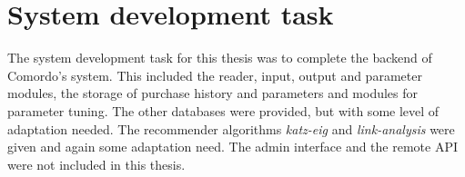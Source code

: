 
\section{System development task}\label{sec:task}

The system development task for this thesis was to complete the backend of Comordo's system. This included the reader, input, output and parameter modules, the storage of purchase history and parameters and modules for parameter tuning. The other databases were provided, but with some level of adaptation needed. The recommender algorithms \textit{katz-eig} and \textit{link-analysis} were given and again some adaptation need. The admin interface and the remote API were not included in this thesis.

